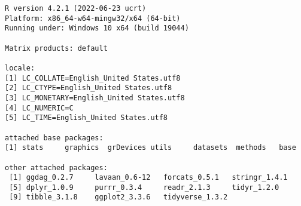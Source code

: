 \documentclass[
  letterpaper,
  DIV=11,
  numbers=noendperiod]{scrreprt}
\begin{document}
\begin{verbatim}
R version 4.2.1 (2022-06-23 ucrt)
Platform: x86_64-w64-mingw32/x64 (64-bit)
Running under: Windows 10 x64 (build 19044)

Matrix products: default

locale:
[1] LC_COLLATE=English_United States.utf8 
[2] LC_CTYPE=English_United States.utf8   
[3] LC_MONETARY=English_United States.utf8
[4] LC_NUMERIC=C                          
[5] LC_TIME=English_United States.utf8    

attached base packages:
[1] stats     graphics  grDevices utils     datasets  methods   base     

other attached packages:
 [1] ggdag_0.2.7     lavaan_0.6-12   forcats_0.5.1   stringr_1.4.1  
 [5] dplyr_1.0.9     purrr_0.3.4     readr_2.1.3     tidyr_1.2.0    
 [9] tibble_3.1.8    ggplot2_3.3.6   tidyverse_1.3.2


\end{verbatim}
\end{document}
